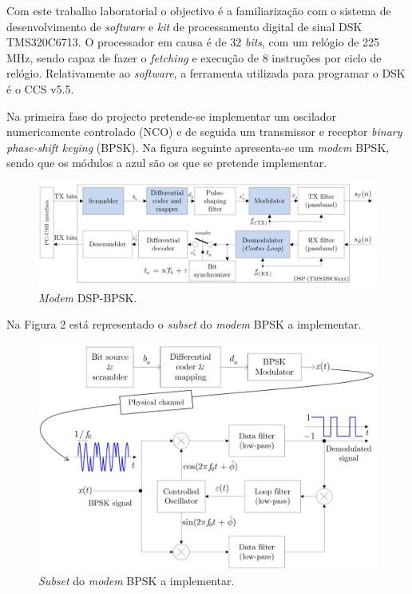 \documentclass[11pt]{article}
\numberwithin{equation}{section}
\begin{document}
Com este trabalho laboratorial o objectivo é a familiarização com o sistema de desenvolvimento de \textit{software} e \textit{kit} de processamento digital de sinal DSK TMS320C6713. O processador em causa é de 32 \textit{bits}, com um relógio de 225 MHz, sendo capaz de fazer o \textit{fetching} e execução de 8 instruções por ciclo de relógio. Relativamente ao \textit{software}, a ferramenta utilizada para programar o DSK é o CCS v5.5.

Na primeira fase do projecto pretende-se implementar um oscilador numericamente controlado (NCO) e de seguida um transmissor e receptor \textit{binary phase-shift keying} (BPSK). Na figura seguinte apresenta-se um \textit{modem} BPSK, sendo que os módulos a azul são os que se pretende implementar.

\begin{figure}[H]
	\centering
	\includegraphics[keepaspectratio=true, scale=0.30]{teoricas/modem}
	\caption{\textit{Modem} DSP-BPSK.}
	\vspace{-0.8em}
\end{figure}

Na Figura 2 está representado o \textit{subset} do \textit{modem} BPSK a implementar.

\begin{figure}[H]
	\centering
	\includegraphics[keepaspectratio=true, scale=0.27]{teoricas/modem2}
	\caption{\textit{Subset} do \textit{modem} BPSK a implementar.}
	\vspace{-0.8em}
\end{figure}
\end{document}
